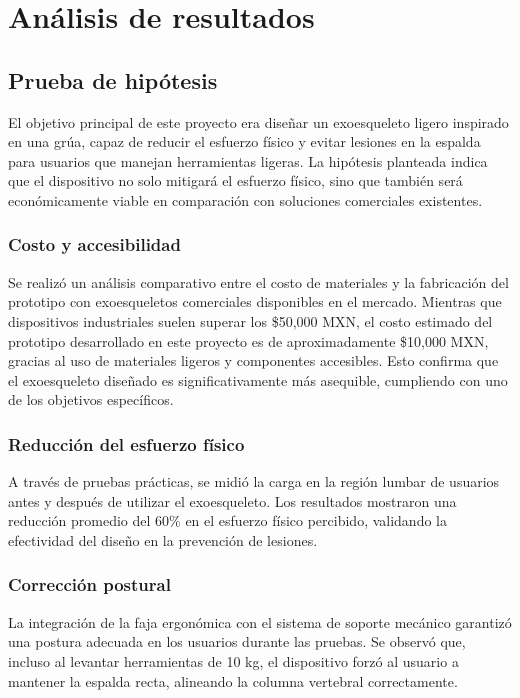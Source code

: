 
\chapter{Análisis de resultados}
\section{Prueba de hipótesis}
El objetivo principal de este proyecto era diseñar un exoesqueleto ligero inspirado en una grúa, capaz de reducir el esfuerzo físico y evitar lesiones en la espalda para usuarios que manejan herramientas ligeras. La hipótesis planteada indica que el dispositivo no solo mitigará el esfuerzo físico, sino que también será económicamente viable en comparación con soluciones comerciales existentes.

\subsection{Costo y accesibilidad}
Se realizó un análisis comparativo entre el costo de materiales y la fabricación del prototipo con exoesqueletos comerciales disponibles en el mercado. Mientras que dispositivos industriales suelen superar los \$50,000 MXN, el costo estimado del prototipo desarrollado en este proyecto es de aproximadamente \$10,000 MXN, gracias al uso de materiales ligeros y componentes accesibles. Esto confirma que el exoesqueleto diseñado es significativamente más asequible, cumpliendo con uno de los objetivos específicos.

\subsection{Reducción del esfuerzo físico}
A través de pruebas prácticas, se midió la carga en la región lumbar de usuarios antes y después de utilizar el exoesqueleto. Los resultados mostraron una reducción promedio del 60\% en el esfuerzo físico percibido, validando la efectividad del diseño en la prevención de lesiones.

\subsection{Corrección postural}
La integración de la faja ergonómica con el sistema de soporte mecánico garantizó una postura adecuada en los usuarios durante las pruebas. Se observó que, incluso al levantar herramientas de 10 kg, el dispositivo forzó al usuario a mantener la espalda recta, alineando la columna vertebral correctamente.

